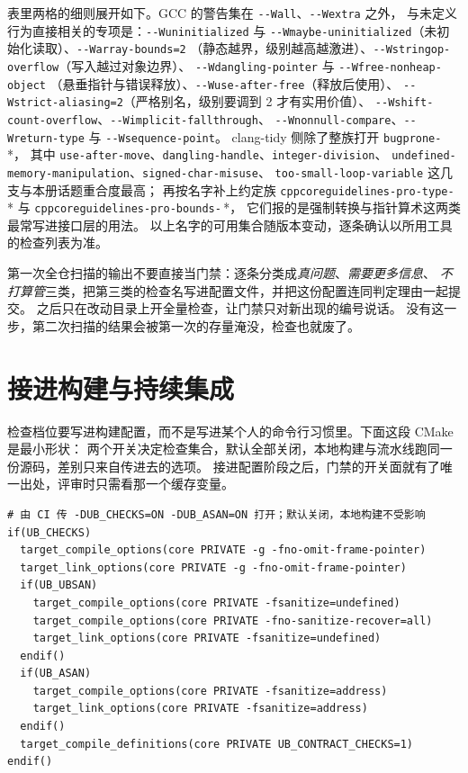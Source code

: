 \documentclass[12pt,a4paper,fontset=fandol]{ctexbook}
\newcommand{\Tp}[1]{\texttt{#1}}
\newcommand{\Opt}[1]{\texttt{-\/-#1}}
\newcommand{\Bk}{\discretionary{}{}{}}
\newcommand{\Mx}[1]{\textsf{#1}}
\begin{document}
表里两格的细则展开如下。GCC 的警告集在 \Opt{Wall}、\Opt{Wextra} 之外，
与未定义行为直接相关的专项是：\Opt{Wuninitialized} 与
\Opt{Wmaybe{\Bk}-uninitialized}（未初始化读取）、\Opt{Warray{\Bk}-bounds=2}
（静态越界，级别越高越激进）、\Opt{Wstringop{\Bk}-overflow}（写入越过对象边界）、
\Opt{Wdangling{\Bk}-pointer} 与 \Opt{Wfree{\Bk}-nonheap{\Bk}-object}
（悬垂指针与错误释放）、\Opt{Wuse{\Bk}-after{\Bk}-free}（释放后使用）、
\Opt{Wstrict{\Bk}-aliasing=2}（严格别名，级别要调到 2 才有实用价值）、
\Opt{Wshift{\Bk}-count-overflow}、\Opt{Wimplicit{\Bk}-fallthrough}、
\Opt{Wnonnull{\Bk}-compare}、\Opt{Wreturn-type} 与 \Opt{Wsequence-point}。
clang-tidy 侧除了整族打开 \Tp{bugprone-}\,*，
其中 \Tp{use-after-move}、\Tp{dangling-handle}、\Tp{integer-division}、
\Tp{undefined-memory-manipulation}、\Tp{signed-char-misuse}、
\Tp{too-small-loop-variable} 这几支与本册话题重合度最高；
再按名字补上约定族 \Tp{cppcoreguidelines{\Bk}-pro{\Bk}-type{\Bk}-}\,* 与
\Tp{cppcoreguidelines{\Bk}-pro{\Bk}-bounds{\Bk}-}\,*，
它们报的是强制转换与指针算术这两类最常写进接口层的用法。
以上名字的可用集合随版本变动，逐条确认以所用工具的检查列表为准。

\begin{bestpractice}[title={分析器的结果要进基线，不要进噪声}]
第一次全仓扫描的输出不要直接当门禁：逐条分类成\emph{真问题}、\emph{需要更多信息}、
\emph{不打算管}三类，把第三类的检查名写进配置文件，并把这份配置连同判定理由一起提交。
之后只在改动目录上开全量检查，让门禁只对新出现的编号说话。
没有这一步，第二次扫描的结果会被第一次的存量淹没，检查也就废了。
\end{bestpractice}

\section{接进构建与持续集成}\label{sec:ub03-ci}

检查档位要写进构建配置，而不是写进某个人的命令行习惯里。下面这段 \Mx{CMake} 是最小形状：
两个开关决定检查集合，默认全部关闭，本地构建与流水线跑同一份源码，差别只来自传进去的选项。
接进配置阶段之后，门禁的开关面就有了唯一出处，评审时只需看那一个缓存变量。

\begin{lstlisting}[style=cmakestyle, caption={把消毒器做成可开关的检查档位}]
# 由 CI 传 -DUB_CHECKS=ON -DUB_ASAN=ON 打开；默认关闭，本地构建不受影响
if(UB_CHECKS)
  target_compile_options(core PRIVATE -g -fno-omit-frame-pointer)
  target_link_options(core PRIVATE -g -fno-omit-frame-pointer)
  if(UB_UBSAN)
    target_compile_options(core PRIVATE -fsanitize=undefined)
    target_compile_options(core PRIVATE -fno-sanitize-recover=all)
    target_link_options(core PRIVATE -fsanitize=undefined)
  endif()
  if(UB_ASAN)
    target_compile_options(core PRIVATE -fsanitize=address)
    target_link_options(core PRIVATE -fsanitize=address)
  endif()
  target_compile_definitions(core PRIVATE UB_CONTRACT_CHECKS=1)
endif()
\end{lstlisting}
\end{document}
